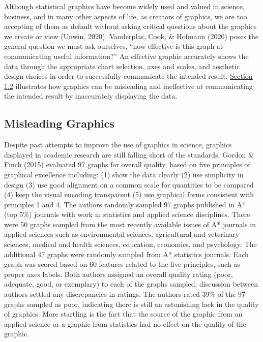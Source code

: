 \documentclass[print]{nuthesis}
\begin{document}
Although statistical graphics have become widely used and valued in science, business, and in many other aspects of life, as creators of graphics, we are too accepting of them as default without asking critical questions about the graphics we create or view (Unwin, 2020).
Vanderplas, Cook, \& Hofmann (2020) poses the general question we must ask ourselves, ``how effective is this graph at communicating useful information?''
An effective graphic accurately shows the data through the appropriate chart selection, axes and scales, and aesthetic design choices in order to successfully communicate the intended result.
\protect\hyperlink{misleading-graphics}{Section 1.2} illustrates how graphics can be misleading and ineffective at communicating the intended result by inaccurately displaying the data.

\hypertarget{misleading-graphics}{%
\subsection{Misleading Graphics}\label{misleading-graphics}}

Despite past attempts to improve the use of graphics in science, graphics displayed in academic research are still falling short of the standards. Gordon \& Finch (2015) evaluated 97 graphs for overall quality, based on five principles of graphical excellence including: (1) show the data clearly (2) use simplicity in design (3) use good alignment on a common scale for quantities to be compared (4) keep the visual encoding transparent (5) use graphical forms consistent with principles 1 and 4.
The authors randomly sampled 97 graphs published in A* (top 5\%) journals with work in statistics and applied science disciplines.
There were 50 graphs sampled from the most recently available issues of A* journals in applied sciences such as environmental sciences, agricultural and veterinary sciences, medical and health sciences, education, economics, and psychology.
The additional 47 graphs were randomly sampled from A* statistics journals.
Each graph was scored based on 60 features related to the five principles, such as proper axes labels.
Both authors assigned an overall quality rating (poor, adequate, good, or exemplary) to each of the graphs sampled; discussion between authors settled any discrepancies in ratings.
The authors rated 39\% of the 97 graphs sampled as poor, indicating there is still an astonishing lack in the quality of graphics.
More startling is the fact that the source of the graphic from an applied science or a graphic from statistics had no effect on the quality of the graphic.
\end{document}
